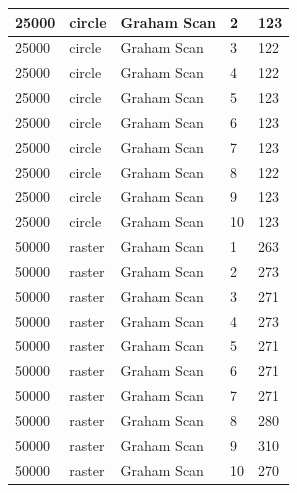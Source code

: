 \documentclass[12pt]{article}
\begin{document}
\begin{longtable}{|l|l|l|l|l|}
25000        & circle            & Graham Scan & 2          & 123                           \\ \hline
25000        & circle            & Graham Scan & 3          & 122                           \\ \hline
25000        & circle            & Graham Scan & 4          & 122                           \\ \hline
25000        & circle            & Graham Scan & 5          & 123                           \\ \hline
25000        & circle            & Graham Scan & 6          & 123                           \\ \hline
25000        & circle            & Graham Scan & 7          & 123                           \\ \hline
25000        & circle            & Graham Scan & 8          & 122                           \\ \hline
25000        & circle            & Graham Scan & 9          & 123                           \\ \hline
25000        & circle            & Graham Scan & 10         & 123                           \\ \hline
50000        & raster            & Graham Scan & 1          & 263                           \\ \hline
50000        & raster            & Graham Scan & 2          & 273                           \\ \hline
50000        & raster            & Graham Scan & 3          & 271                           \\ \hline
50000        & raster            & Graham Scan & 4          & 273                           \\ \hline
50000        & raster            & Graham Scan & 5          & 271                           \\ \hline
50000        & raster            & Graham Scan & 6          & 271                           \\ \hline
50000        & raster            & Graham Scan & 7          & 271                           \\ \hline
50000        & raster            & Graham Scan & 8          & 280                           \\ \hline
50000        & raster            & Graham Scan & 9          & 310                           \\ \hline
50000        & raster            & Graham Scan & 10         & 270                           \\ \hline

\end{longtable}
\end{document}
